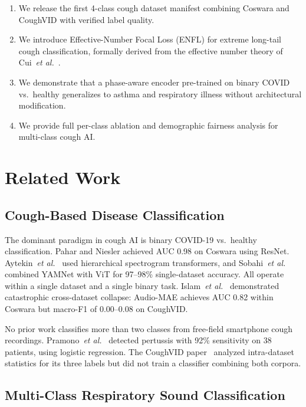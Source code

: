 \documentclass[journal]{IEEEtran}
\begin{document}
\begin{enumerate}
\item We release the first 4-class cough dataset manifest combining
Coswara and CoughVID with verified label quality.
\item We introduce Effective-Number Focal Loss (ENFL) for extreme
long-tail cough classification, formally derived from the effective
number theory of Cui~\textit{et al.}~\cite{effectivenum}.
\item We demonstrate that a phase-aware encoder pre-trained on
binary COVID vs.\ healthy generalizes to asthma and respiratory
illness without architectural modification.
\item We provide full per-class ablation and demographic fairness
analysis for multi-class cough AI.
\end{enumerate}

\section{Related Work}
\label{sec:related}

\subsection{Cough-Based Disease Classification}

The dominant paradigm in cough AI is binary COVID-19 vs.\ healthy
classification. Pahar and Niesler \cite{pahar2022} achieved AUC 0.98
on Coswara using ResNet. Aytekin~\textit{et al.}\ \cite{aytekin2024}
used hierarchical spectrogram transformers, and Sobahi~\textit{et al.}\
\cite{sobahi2022} combined YAMNet with ViT for 97--98\% single-dataset
accuracy. All operate within a single dataset and a single binary task.
Islam~\textit{et al.}\ \cite{islam2025} demonstrated catastrophic
cross-dataset collapse: Audio-MAE achieves AUC 0.82 within Coswara
but macro-F1 of 0.00--0.08 on CoughVID.

No prior work classifies more than two classes from free-field
smartphone cough recordings. Pramono~\textit{et al.}\ \cite{pramono2016}
detected pertussis with 92\% sensitivity on 38 patients, using
logistic regression. The CoughVID paper~\cite{coughvid} analyzed
intra-dataset statistics for its three labels but did not train a
classifier combining both corpora.

\subsection{Multi-Class Respiratory Sound Classification}
\end{document}
